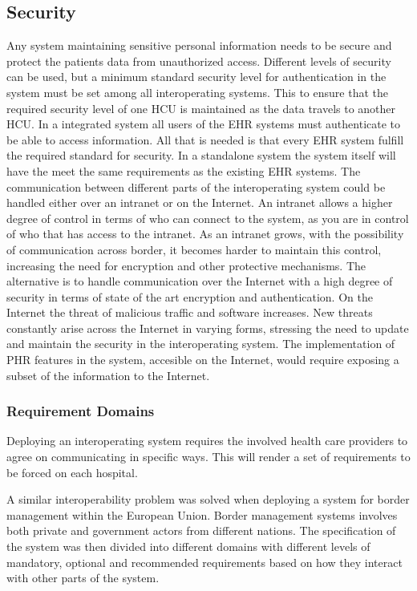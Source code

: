 \documentclass[14pt]{article}
\begin{document}
\subsection{Security}
\label{sec:resultsSecurity}
Any system maintaining sensitive personal information needs to be secure and protect the patients data from unauthorized access. Different levels of security can be used, but a minimum standard security level for authentication in the system must be set among all interoperating systems. This to ensure that the required security level of one \gls{HCU} is maintained as the data travels to another \gls{HCU}. In a integrated system all users of the \gls{EHR} systems must authenticate to be able to access information. All that is needed is that every EHR system fulfill the required standard for security. In a standalone system the system itself will have the meet the same requirements as the existing \gls{EHR} systems. The communication between different parts of the interoperating system could be handled either over an intranet or on the Internet. An intranet allows a higher degree of control in terms of who can connect to the system, as you are in control of who that has access to the intranet. As an intranet grows, with the possibility of communication across border, it becomes harder to maintain this control, increasing the need for encryption and other protective mechanisms. The alternative is to handle communication over the Internet with a high degree of security in terms of state of the art encryption and authentication. On the Internet the threat of malicious traffic and software increases. New threats constantly arise across the Internet in varying forms, stressing the need to update and maintain the security in the interoperating system.
The implementation of \gls{PHR} features in the system, accesible on the Internet, would require exposing a subset of the information to the Internet.

\subsubsection{Requirement Domains}
Deploying an interoperating system requires the involved health care providers to agree on communicating in specific ways. This will render a set of requirements to be forced on each hospital. 

A similar interoperability problem was solved when deploying a system for border management within the European Union. Border management systems involves both private and government actors from different nations. The specification of the system was then divided into different domains with different levels of mandatory, optional and recommended requirements based on how they interact with other parts of the system. \cite{BorderMgmt}
\end{document}
